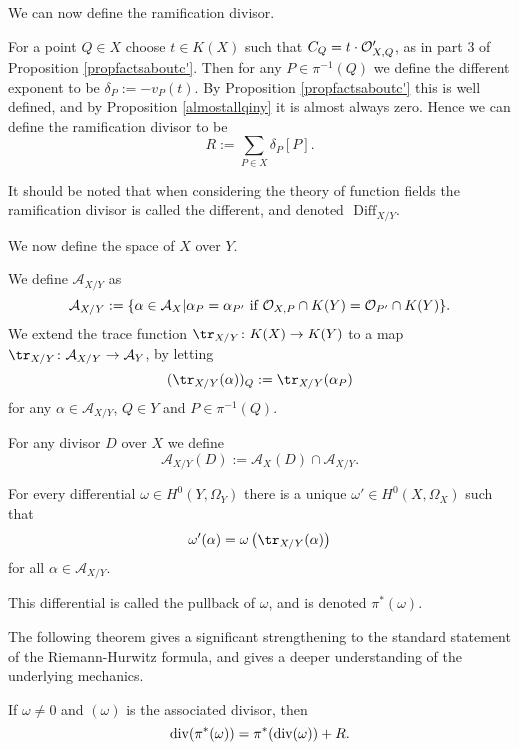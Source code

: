 We can now define the ramification divisor.


    \begin{defn}\label{definitiondifferent}
    For a point $Q\in X$ choose $t\in K(X)$ such that $C_Q = t\cdot {\cal O}_{X,Q}'$, as in part 3 of Proposition \ref{propfactsaboutc'}.
    Then for any $P\in \pi^{-1}(Q)$ we define the different exponent to be $\delta_P := -v_P(t)$.
    By Proposition \ref{propfactsaboutc'} this is well defined, and by Proposition \ref{almostallqiny} it is almost always zero.
    Hence we can define the ramification divisor to be
        \[
        R := \sum_{P\in X} \delta_P [P].
        \]
    \end{defn}

    \begin{rem}
    It should be noted that when considering the theory of function fields the ramification divisor is called the different, and denoted $\text{ Diff}_{X/Y}$.
    \end{rem}

We now define the \adele space of $X$ over $Y$.

    \begin{defn}
    We define $\mathcal {A}_{X/Y}$ as
        \[
        \mathcal{A}_{X/Y} := \{\alpha \in \mathcal{A}_X | \alpha_P =\alpha_{P'}\ \text{if}\ {\cal O}_{X,P}\cap K(Y) = {\cal O}_{P'}\cap K(Y)\}.
        \]
    We extend the trace function $\tr_{X/Y}\colon K(X)\rightarrow K(Y)$ to a map $\tr_{X/Y}\colon \mathcal{A}_{X/Y} \rightarrow \mathcal{A}_Y$,  by letting
        \[
        (\tr_{X/Y}(\alpha))_Q := \tr_{X/Y}(\alpha_P)
        \]
    for any $\alpha \in \mathcal{A}_{X/Y}$, $Q\in Y$ and $P\in \pi^{-1}(Q)$.
    
    For any divisor $D$ over $X$ we define
        \[
        \mathcal{A}_{X/Y}(D) := \mathcal{A}_X(D) \cap \mathcal{A}_{X/Y}.
        \]
    
    \end{defn}


    \begin{defn}\label{theoremdetailedhurwitz}
    For every differential $\omega\in H^0(Y,\Omega_Y)$ there is a unique $\omega'\in H^0(X,\Omega_X)$ such that
        \[
        \omega'(\alpha) = \omega\left(\tr_{X/Y}(\alpha)\right)
        \]
    for all $\alpha \in {\mathcal A}_{X/Y}$.
    
    This differential is called the pullback of $\omega$, and is denoted $\pi^*(\omega)$. 
    \end{defn}

The following theorem gives a significant strengthening to the standard statement of the Riemann-Hurwitz formula, and gives a deeper understanding of the underlying mechanics.
    \begin{thm}
    If $\omega\neq 0$ and $(\omega)$ is the associated divisor, then 
        \[
        \operatorname{div} ( \pi^*(\omega)) = \pi^*(\operatorname{div}(\omega)) + R.
        \]
    \end{thm}

